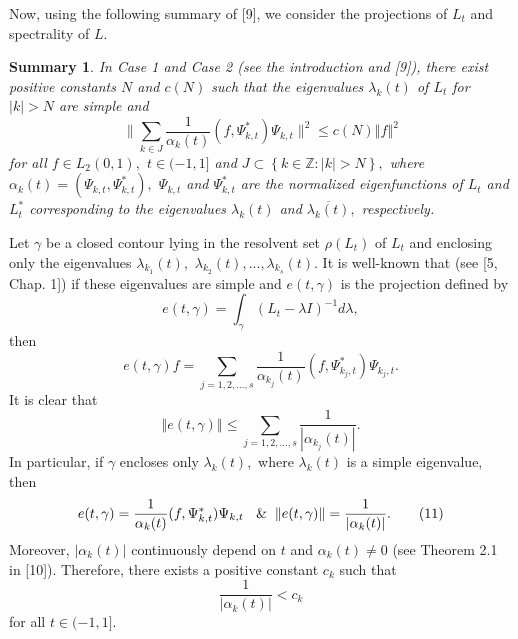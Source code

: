 \documentclass{article}%
\newtheorem{summary}{Summary}
\begin{document}
Now, using the following summary of [9], we consider the projections of
$L_{t}$ and spectrality of $L.$

\begin{summary}
In Case 1 and Case 2 (see the introduction and [9]), there exist positive
constants $N$ and $c(N)$ such that the eigenvalues $\lambda_{k}(t)$ of $L_{t}$
for $\left\vert k\right\vert >N$ are simple and
\begin{equation}
\parallel%
{\textstyle\sum\limits_{k\in J}}
\frac{1}{\alpha_{k}(t)}(f,\Psi_{k,t}^{\ast})\Psi_{k,t}\parallel^{2}\leq
c(N)\left\Vert f\right\Vert ^{2} \tag{9}%
\end{equation}
for all $f\in L_{2}(0,1),$ $t\in(-1,1]$ and $J\subset\left\{  k\in
\mathbb{Z}:\left\vert k\right\vert >N\right\}  ,$ where $\alpha_{k}%
(t)=(\Psi_{k,t},\Psi_{k,t}^{\ast}),$ $\Psi_{k,t}$ and $\Psi_{k,t}^{\ast}$ are
the normalized eigenfunctions of $L_{t}$ and $L_{t}^{\ast}$ corresponding to
the eigenvalues $\lambda_{k}(t)$ and $\overline{\lambda_{k}(t)},$ respectively.
\end{summary}

Let $\gamma$ be a closed contour lying in the resolvent set $\rho(L_{t})$ of
$L_{t}$ and enclosing only the eigenvalues $\lambda_{k_{1}}(t),$
$\lambda_{k_{2}}(t),...,\lambda_{k_{s}}(t)$. It is well-known that (see [5,
Chap. 1]) if these eigenvalues are simple and $e(t,\gamma)$ is the projection
defined by%
\[
e(t,\gamma)=\int_{\gamma}\left(  L_{t}-\lambda I\right)  ^{-1}d\lambda,\text{
}%
\]
then
\[
e(t,\gamma)f=%
{\textstyle\sum\limits_{j=1,2,...,s}}
\frac{1}{\alpha_{k_{j}}(t)}(f,\Psi_{k_{j},t}^{\ast})\Psi_{k_{j},t}.
\]
It is clear that
\begin{equation}
\left\Vert e(t,\gamma)\right\Vert \leq%
{\textstyle\sum\limits_{j=1,2,...,s}}
\frac{1}{\left\vert \alpha_{k_{j}}(t)\right\vert }. \tag{10}%
\end{equation}
In particular, if $\gamma$ encloses only $\lambda_{k}(t),$ where $\lambda
_{k}(t)$ is a simple eigenvalue, then
\begin{equation}
e(t,\gamma)=\frac{1}{\alpha_{k}(t)}(f,\Psi_{k,t}^{\ast})\Psi_{k,t}\text{ }%
\And\left\Vert e(t,\gamma)\right\Vert =\frac{1}{\left\vert \alpha
_{k}(t)\right\vert }. \tag{11}%
\end{equation}
Moreover, $\left\vert \alpha_{k}(t)\right\vert $ continuously depend on $t$
and $\alpha_{k}(t)\neq0$ (see Theorem 2.1 in [10]). Therefore, there exists a
positive constant $c_{k}$ such that%
\begin{equation}
\frac{1}{\left\vert \alpha_{k}(t)\right\vert }<c_{k} \tag{12}%
\end{equation}
for all $t\in(-1,1].$
\end{document}
